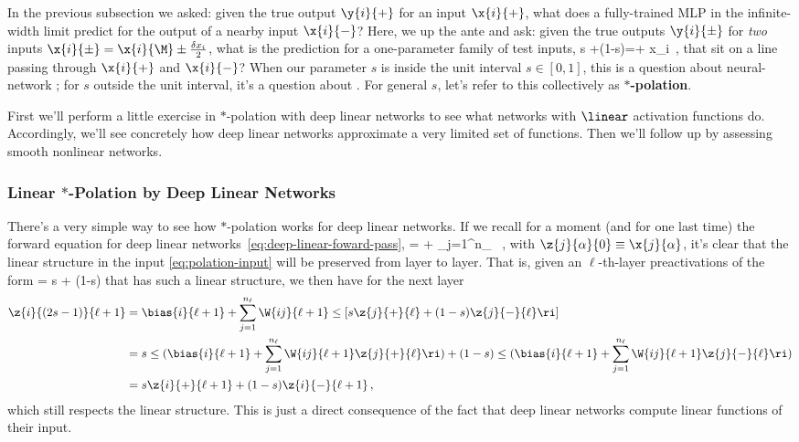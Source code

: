 In the previous subsection we asked: given the true output $\y{i}{+}$ for an input $\x{i}{+}$, what does a fully-trained MLP in the infinite-width limit predict for the output of a nearby input $\x{i}{-}$? Here, we up the ante and ask: given the true outputs $\y{i}{\pm}$ for \emph{two} inputs $\x{i}{\pm}=\x{i}{\M}\pm \frac{\delta x_i}{2}$, what is the prediction for a one-parameter family of test inputs,
\be\label{eq:polation-input}
s +(1-s)=+ \delta x_i\equiv {}\, ,
\ee
that sit on a line passing through $\x{i}{+}$ and $\x{i}{-}$?
When our parameter $s$ is inside the unit interval $s\in[0,1]$, this is a question about neural-network ; for $s$ outside the unit interval, it's a question about . For general $s$, let's refer to this collectively as \textbf{$\ast$-polation}. 

First we'll perform a little exercise in $\ast$-polation with deep linear networks to see what networks with $\linear$ activation functions do. Accordingly, we'll see concretely how deep linear networks approximate a very limited set of functions. Then we'll follow up by assessing smooth nonlinear networks.

\subsubsection{Linear $\ast$-Polation by Deep Linear Networks}

There's a very simple way to see how $\ast$-polation works for deep linear networks.
If we recall for a moment (and for one last time) the forward equation for deep linear networks~\eqref{eq:deep-linear-foward-pass},
\be\label{eq:deep-linear-foward-pass-reprint}
 =  + \sum_{j=1}^{n_\ell}  \, ,
\ee
with $\z{j}{\alpha}{0}\equiv\x{j}{\alpha}$,  it's clear that the linear structure in the input \eqref{eq:polation-input} will be preserved from layer to layer. That is, given an $\ell$-th-layer preactivations of the form
\be
{} = s + (1-s)
\ee
that has such a linear structure, we then have for the next layer
\begin{align}
\z{i}{(2s-1)}{\ell+1} &= \bias{i}{\ell+1} + \sum_{j=1}^{n_\ell}\W{ij}{\ell+1}\le[s\z{j}{+}{\ell} + (1-s)\z{j}{-}{\ell}\ri] \, \\
&=s\le( \bias{i}{\ell+1} +    \sum_{j=1}^{n_\ell}\W{ij}{\ell+1}\z{j}{+}{\ell} \ri) + (1-s)\le( \bias{i}{\ell+1} + \sum_{j=1}^{n_\ell}\W{ij}{\ell+1}\z{j}{-}{\ell}\ri) \notag \\
&= s\z{i}{+}{\ell+1} + (1-s)\z{i}{-}{\ell+1} \, \notag ,
\end{align}
which still respects the linear structure. This is just a direct consequence of the fact that deep linear networks compute linear functions of their input.


